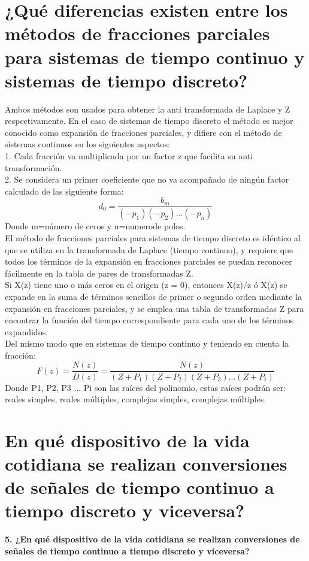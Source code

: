 \section{¿Qué diferencias existen entre los métodos de fracciones parciales para sistemas de tiempo continuo y sistemas de tiempo discreto?}
\newline
Ambos métodos son usados para obtener la anti transformada de Laplace y Z respectivamente. En el caso de sistemas de tiempo discreto el método es mejor conocido como expansión de fracciones parciales, y difiere con el método de sistemas continuos en los siguientes aspectos:\\
1. Cada fracción va multiplicada por un factor z que facilita su anti transformación.\\
2. Se considera un primer coeficiente que no va acompañado de ningún factor calculado de las siguiente forma:\\
\[
d_{0}=\frac{b_{m}} {(−p_{1})(−p_{2})...(−p_{n})}
\]
Donde m=número de ceros y n=numerode polos.\\    
El método de fracciones parciales para sistemas de tiempo discreto es idéntico al que se utiliza en la transformada de Laplace (tiempo continuo), y requiere que todos los términos de la expansión en fracciones parciales se puedan reconocer fácilmente en la tabla de pares de transformadas Z.\\
Si X(z) tiene uno o más ceros en el origen (z = 0), entonces X(z)/z ó X(z) se expande en la suma de términos sencillos de primer o segundo orden mediante la expansión en fracciones parciales, y se emplea una tabla de transformadas Z para encontrar la función del tiempo correspondiente para cada uno de los términos expandidos.\\    
Del mismo modo que en sistemas de tiempo continuo y teniendo en cuenta la fracción:\\
\[
F(z)=\frac{N(z)}{D(z)}=\frac{N(z)}{(Z+P_{1})(Z+P_{2})(Z+P_{3})...(Z+P_{i})}
\]
Donde P1, P2, P3 ... Pi son las raíces del polinomio, estas raíces podrán ser: reales simples, reales múltiples, complejas simples, complejas múltiples.

\section{En qué dispositivo de la vida cotidiana se realizan conversiones de señales de tiempo continuo a tiempo discreto y viceversa?}

	\noindent\textbf{5. ¿En qué dispositivo de la vida cotidiana se realizan conversiones de señales de tiempo continuo a tiempo discreto y viceversa?}
	\newline
	
